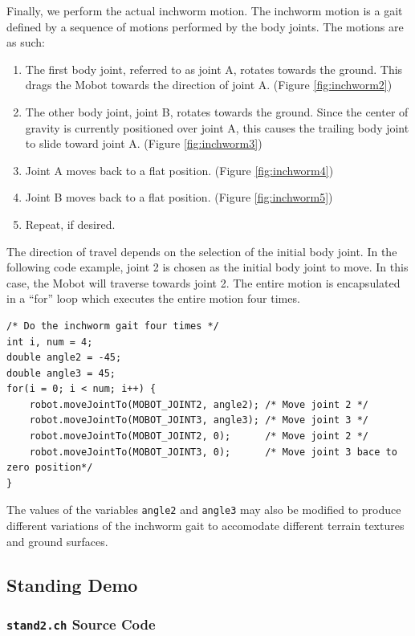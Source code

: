 \documentclass{article}
\begin{document}
Finally, we perform the actual inchworm motion. The inchworm motion is a gait defined
by a sequence of motions performed by the body joints. The motions are as such:
\begin{enumerate}
\item The first body joint, referred to as joint A, rotates towards the ground.
This drags the Mobot towards the direction of joint A. (Figure \ref{fig:inchworm2})
\item The other body joint, joint B, rotates towards the ground. Since the center
of gravity is currently positioned over joint A, this causes the trailing body 
joint to slide toward joint A. (Figure \ref{fig:inchworm3})
\item Joint A moves back to a flat position. (Figure \ref{fig:inchworm4})
\item Joint B moves back to a flat position. (Figure \ref{fig:inchworm5})
\item Repeat, if desired.
\end{enumerate}
The direction of travel depends on the selection of the initial body joint. In
the following code example, joint 2 is chosen as the initial body joint to move.
In this case, the Mobot will traverse towards joint 2. The entire motion is
encapsulated in a ``for'' loop which executes the entire motion four times.
\begin{verbatim}
/* Do the inchworm gait four times */
int i, num = 4;
double angle2 = -45;
double angle3 = 45;
for(i = 0; i < num; i++) {
    robot.moveJointTo(MOBOT_JOINT2, angle2); /* Move joint 2 */
    robot.moveJointTo(MOBOT_JOINT3, angle3); /* Move joint 3 */
    robot.moveJointTo(MOBOT_JOINT2, 0);      /* Move joint 2 */
    robot.moveJointTo(MOBOT_JOINT3, 0);      /* Move joint 3 bace to zero position*/
}
\end{verbatim}
The values of the variables \texttt{angle2} and \texttt{angle3} may also be modified
to produce different variations of the inchworm gait to accomodate different terrain
textures and ground surfaces.

\subsection{Standing Demo}
\subsubsection{\texttt{stand2.ch} Source Code}

\end{document}
